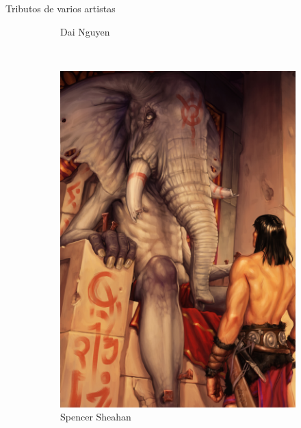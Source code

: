 \begin{frame}{Tributos de varios artistas}
\begin{figure}[htp]
\begin{subfigure}[b]{0.22\textwidth}
   \caption{Dai Nguyen}
 \end{subfigure}
~
 \begin{subfigure}[b]{0.22\textwidth}
   \includegraphics[width=\textwidth]{img/tributos/elephant08}
   \caption{Spencer Sheahan}
 \end{subfigure}
~
 \begin{subfigure}[b]{0.22\textwidth}

\end{subfigure}
\end{figure}
\end{frame}

